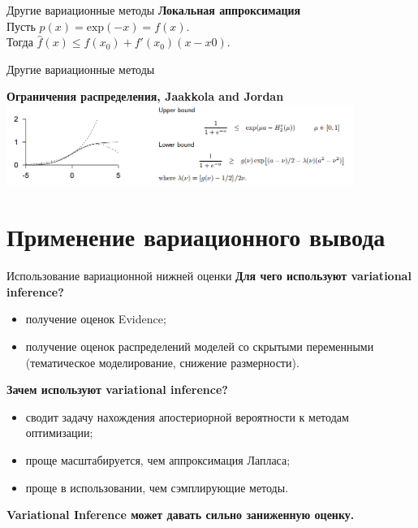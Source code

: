 \documentclass[10pt,pdf,utf8,russian,aspectratio=169]{beamer}
\begin{document}
\begin{frame}{Другие вариационные методы}
  \centering
\textbf{Локальная аппроксимация}\\
Пусть $p(x) = \text{exp}(-x) = f(x)$.\\
Тогда $\hat{f}(x) \leq f(x_0) + f'(x_0)(x-x0)$.\\

\begin{figure}
  \centering
\label{fig:1}\qquad

\end{figure}
\end{frame}
\begin{frame}{Другие вариационные методы}

\textbf{Ограничения распределения, Jaakkola and Jordan}\\
 {\includegraphics[width=0.85\textwidth]{jac.png}}
\end{frame}

\section{Применение вариационного вывода}

\begin{frame}{Использование вариационной нижней оценки}
\textbf{Для чего используют variational inference?}
\begin{itemize}
\item получение оценок Evidence;
\item получение оценок распределений моделей со скрытыми переменными (тематическое моделирование, снижение размерности).
\end{itemize}

\textbf{Зачем используют variational inference?}
\begin{itemize}
\item сводит задачу нахождения апостериорной вероятности к методам оптимизации;
\item проще масштабируется, чем аппроксимация Лапласа;
\item проще в использовании, чем сэмплирующие методы.
\end{itemize}
\textbf{Variational Inference может давать сильно заниженную оценку.}
\end{frame}
\end{document}
